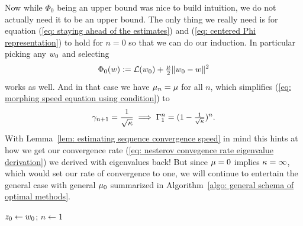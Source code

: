 Now while \(\Phi_0\) being an upper bound was nice to build intuition, we do
not actually need it to be an upper bound. The only thing we really need is
for equation (\ref{eq: staying ahead of the estimates}) and (\ref{eq: centered
Phi representation}) to hold for \(n=0\) so that we can do our induction. In
particular picking any \(w_0\) and selecting
\begin{align*}
	\Phi_0(w):= \mathcal{L}(w_0) + \tfrac{\mu}{2}\|w_0 - w\|^2
\end{align*}
works as well. And in that case we have \(\mu_n = \mu\) for all \(n\),
which simplifies (\ref{eq: morphing speed equation using condition}) to
\begin{align}\label{eq: convergence rate for lbound_0=lbound}
	\gamma_{n+1} = \frac1{\sqrt{\kappa}} \implies \Gamma_1^n = (1-\tfrac{1}{\sqrt{\kappa}})^n.
\end{align}
With Lemma~\ref{lem: estimating sequence convergence speed} in mind this hints
at how we get our convergence rate (\ref{eq: nesterov convegence rate eigenvalue derivation})
we derived with eigenvalues back!
But since \(\mu=0\) implies \(\kappa=\infty\),
which would set our rate of convergence to one, we will continue
to entertain the general case with general \(\mu_0\) summarized in
Algorithm~\ref{algo: general schema of optimal methods}. 
%
\begin{algorithm}
	\(z_0\leftarrow w_0\);
	\(n\leftarrow 1\)\;
	\caption{
		General Schema of Optimal Methods (by \citeauthor{nesterovLecturesConvexOptimization2018})%
		\label{algo: general schema of optimal methods}
	}
\end{algorithm}
